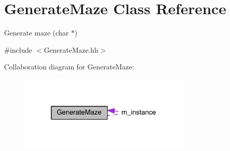 \hypertarget{class_generate_maze}{}\section{Generate\+Maze Class Reference}
\label{class_generate_maze}


Generate maze (char $\ast$)  




{\ttfamily \#include $<$Generate\+Maze.\+hh$>$}



Collaboration diagram for Generate\+Maze\+:\nopagebreak
\begin{figure}[H]
\begin{center}
\leavevmode
\includegraphics[width=235pt]{class_generate_maze__coll__graph}
\end{center}
\end{figure}
